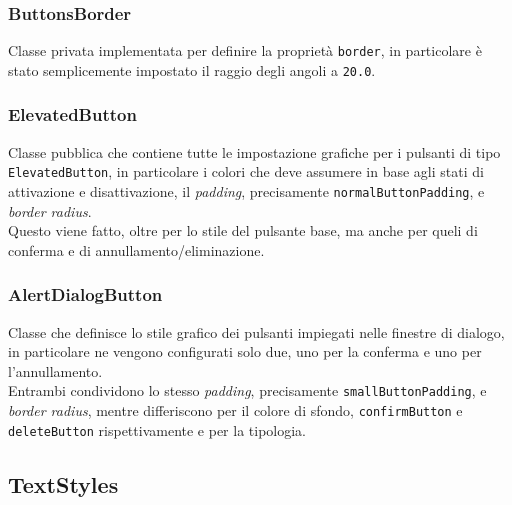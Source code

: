 \subsubsection*{ButtonsBorder}
\label{subsubsec:button-border}

Classe privata implementata per definire la proprietà \lstinline{border}\cite{site:border}, in particolare è stato semplicemente impostato il raggio degli angoli a \lstinline{20.0}.

\subsubsection*{ElevatedButton}
\label{subsubsec:elevated-button}

Classe pubblica che contiene tutte le impostazione grafiche per i pulsanti di tipo \lstinline{ElevatedButton}\cite{site:elevated-button}, in particolare i colori che deve assumere in base agli stati di attivazione e disattivazione, il \emph{padding}, precisamente \lstinline{normalButtonPadding}, e \emph{border radius}\cite{site:border}. \\
Questo viene fatto, oltre per lo stile del pulsante base, ma anche per queli di conferma e di annullamento/eliminazione.

\subsubsection*{AlertDialogButton}
\label{subsubsec:alert-dialog-button}

Classe che definisce lo stile grafico dei pulsanti impiegati nelle finestre di dialogo, in particolare ne vengono configurati solo due, uno per la conferma e uno per l'annullamento. \\
Entrambi condividono lo stesso \emph{padding}, precisamente \lstinline{smallButtonPadding}, e \emph{border radius}\cite{site:border}, mentre differiscono per il colore di sfondo, \lstinline{confirmButton} e \lstinline{deleteButton} rispettivamente e per la tipologia.

\subsection{TextStyles}
\label{subsec:text-styles}

